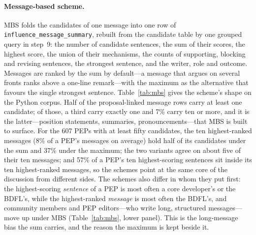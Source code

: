 \documentclass[sigconf,screen]{acmart}
\begin{document}
\paragraph{Message-based scheme.} MBS folds the candidates of one message into one row of \texttt{influence\_message\_summary}, rebuilt from the candidate table by one grouped query in step~9: the number of candidate sentences, the sum of their scores, the highest score, the union of their mechanisms, the counts of supporting, blocking and revising sentences, the strongest sentence, and the writer, role and outcome. Messages are ranked by the sum by default---a message that argues on several fronts ranks above a one-line remark---with the maximum as the alternative that favours the single strongest sentence. Table~\ref{tab:mbs} gives the scheme's shape on the Python corpus. Half of the proposal-linked message rows carry at least one candidate; of those, a third carry exactly one and 7\% carry ten or more, and it is the latter---position statements, summaries, pronouncements---that MBS is built to surface. For the 607 PEPs with at least fifty candidates, the ten highest-ranked messages (8\% of a PEP's messages on average) hold half of its candidates under the sum and 37\% under the maximum; the two variants agree on about five of their ten messages; and 57\% of a PEP's ten highest-scoring sentences sit inside its ten highest-ranked messages, so the schemes point at the same core of the discussion from different sides. The schemes also differ in whom they put first: the highest-scoring \emph{sentence} of a PEP is most often a core developer's or the BDFL's, while the highest-ranked \emph{message} is most often the BDFL's, and community members and PEP editors---who write long, structured messages---move up under MBS (Table~\ref{tab:mbs}, lower panel). This is the long-message bias the sum carries, and the reason the maximum is kept beside it.
\end{document}
